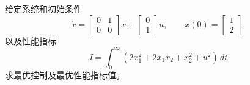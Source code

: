 \documentclass[11pt]{article}
\begin{document}

\begin{problem}[原题 2]
给定系统和初始条件
\[
 \dot x=\begin{bmatrix}0&1\\0&0\end{bmatrix}x
 +\begin{bmatrix}0\\1\end{bmatrix}u,\qquad
 x(0)=\begin{bmatrix}1\\2\end{bmatrix},
\]
以及性能指标
\[
 J=\int_0^\infty(2x_1^2+2x_1x_2+x_2^2+u^2)\,dt.
\]
求最优控制及最优性能指标值。
\end{problem}
\end{document}
